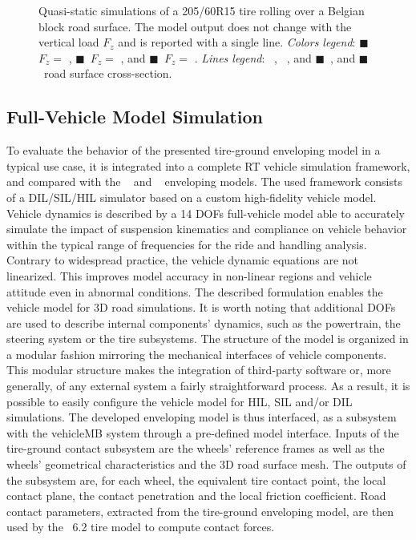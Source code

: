 \begin{figure}[htb]
  \centering
  \caption{Quasi-static simulations of a 205/60R15 tire rolling over a Belgian block road surface. The \TMEasy{} model output does not change with the vertical load $F_z$ and is reported with a single line. \emph{Colors legend}: {\color{mycolor1}$\blacksquare$}~$F_z =$ , {\color{mycolor2}$\blacksquare$}~$F_z =$ , and {\color{mycolor3}$\blacksquare$}~$F_z =$ . \emph{Lines legend}: \raisebox{1.0pt}{\textbf{---}}~\Enve{}, \raisebox{1.0pt}{\textbf{--~--}}~\Swift{}, and {\color{mycolor5}$\blacksquare$}~\TMEasy{}, and {\color{black}$\blacksquare$}~road surface cross-section.}
  \label{app2:fig:cobblestone}
\end{figure}


\subsection{Full-Vehicle Model Simulation}
\label{app2:sec:simulator}

To evaluate the behavior of the presented tire-ground enveloping model in a typical use case, it is integrated into a complete \ac{RT} vehicle simulation framework, and compared with the \Swift{}~\cite{schmeitz2004semiempirical} and \TMEasy~\cite{rill2013tmeasy, rill2018sophisticated}{} enveloping models. The used framework consists of a DIL/SIL/HIL simulator based on a custom high-fidelity vehicle model. Vehicle dynamics is described by a 14 \acp{DOF} full-vehicle model able to accurately simulate the impact of suspension kinematics and compliance on vehicle behavior within the typical range of frequencies for the ride and handling analysis. Contrary to widespread practice, the vehicle dynamic equations are not linearized. This improves model accuracy in non-linear regions and vehicle attitude even in abnormal conditions. The described formulation enables the vehicle model for 3D road simulations. It is worth noting that additional \acp{DOF} are used to describe internal components' dynamics, such as the powertrain, the steering system or the tire subsystems. The structure of the model is organized in a modular fashion mirroring the mechanical interfaces of vehicle components. This modular structure makes the integration of third-party software or, more generally, of any external system a fairly straightforward process. As a result, it is possible to easily configure the vehicle model for HIL, SIL and/or DIL simulations. The developed enveloping model is thus interfaced, as a subsystem with the vehicle\ac{MB} system through a pre-defined model interface. Inputs of the tire-ground contact subsystem are the wheels' reference frames as well as the wheels' geometrical characteristics and the 3D road surface mesh. The outputs of the subsystem are, for each wheel, the equivalent tire contact point, the local contact plane, the contact penetration and the local friction coefficient. Road contact parameters, extracted from the tire-ground enveloping model, are then used by the \MagicFormulae{}~6.2 tire model to compute contact forces.

